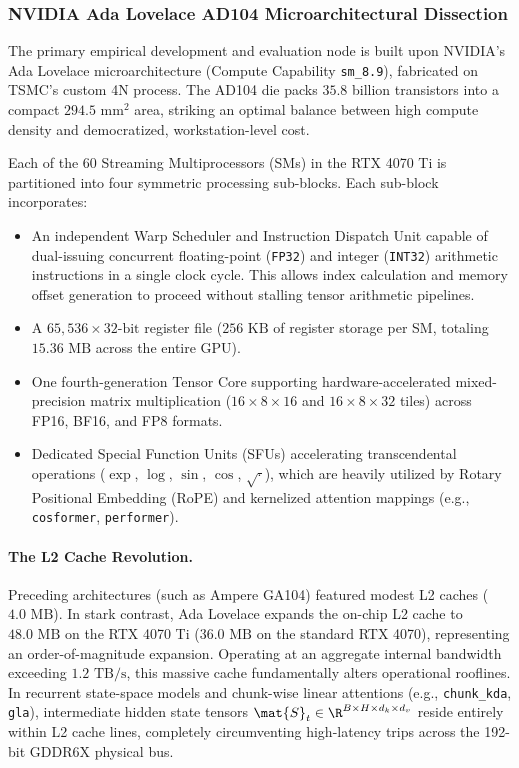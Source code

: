 \subsubsection{NVIDIA Ada Lovelace AD104 Microarchitectural Dissection}
The primary empirical development and evaluation node is built upon NVIDIA's Ada Lovelace microarchitecture (Compute Capability \texttt{sm\_8.9}), fabricated on TSMC's custom 4N process. The AD104 die packs $35.8$ billion transistors into a compact $294.5\text{ mm}^2$ area, striking an optimal balance between high compute density and democratized, workstation-level cost. 

Each of the 60 Streaming Multiprocessors (SMs) in the RTX 4070 Ti is partitioned into four symmetric processing sub-blocks. Each sub-block incorporates:
\begin{itemize}
    \item An independent Warp Scheduler and Instruction Dispatch Unit capable of dual-issuing concurrent floating-point (\texttt{FP32}) and integer (\texttt{INT32}) arithmetic instructions in a single clock cycle. This allows index calculation and memory offset generation to proceed without stalling tensor arithmetic pipelines.
    \item A $65{,}536 \times 32\text{-bit}$ register file ($256\text{ KB}$ of register storage per SM, totaling $15.36\text{ MB}$ across the entire GPU).
    \item One fourth-generation Tensor Core supporting hardware-accelerated mixed-precision matrix multiplication ($16 \times 8 \times 16$ and $16 \times 8 \times 32$ tiles) across FP16, BF16, and FP8 formats.
    \item Dedicated Special Function Units (SFUs) accelerating transcendental operations ($\exp$, $\log$, $\sin$, $\cos$, $\sqrt{\cdot}$), which are heavily utilized by Rotary Positional Embedding (RoPE) and kernelized attention mappings (e.g., \texttt{cosformer}, \texttt{performer}).
\end{itemize}

\paragraph{The L2 Cache Revolution.} Preceding architectures (such as Ampere GA104) featured modest L2 caches ($4.0\text{ MB}$). In stark contrast, Ada Lovelace expands the on-chip L2 cache to $48.0\text{ MB}$ on the RTX 4070 Ti ($36.0\text{ MB}$ on the standard RTX 4070), representing an order-of-magnitude expansion. Operating at an aggregate internal bandwidth exceeding $1.2\text{ TB/s}$, this massive cache fundamentally alters operational rooflines. In recurrent state-space models and chunk-wise linear attentions (e.g., \texttt{chunk\_kda}, \texttt{gla}), intermediate hidden state tensors $\mat{S}_t \in \R^{B \times H \times d_k \times d_v}$ reside entirely within L2 cache lines, completely circumventing high-latency trips across the 192-bit GDDR6X physical bus.

